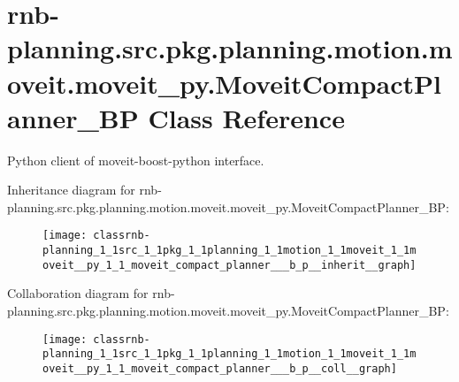 \hypertarget{classrnb-planning_1_1src_1_1pkg_1_1planning_1_1motion_1_1moveit_1_1moveit__py_1_1_moveit_compact_planner___b_p}{}\section{rnb-\/planning.src.\+pkg.\+planning.\+motion.\+moveit.\+moveit\+\_\+py.\+Moveit\+Compact\+Planner\+\_\+\+BP Class Reference}
\label{classrnb-planning_1_1src_1_1pkg_1_1planning_1_1motion_1_1moveit_1_1moveit__py_1_1_moveit_compact_planner___b_p}


Python client of moveit-\/boost-\/python interface.  




Inheritance diagram for rnb-\/planning.src.\+pkg.\+planning.\+motion.\+moveit.\+moveit\+\_\+py.\+Moveit\+Compact\+Planner\+\_\+\+BP\+:\nopagebreak
\begin{figure}[H]
\begin{center}
\leavevmode
\texttt{[image: classrnb-planning\_1\_1src\_1\_1pkg\_1\_1planning\_1\_1motion\_1\_1moveit\_1\_1moveit\_\_py\_1\_1\_moveit\_compact\_planner\_\_\_b\_p\_\_inherit\_\_graph]}
\end{center}
\end{figure}


Collaboration diagram for rnb-\/planning.src.\+pkg.\+planning.\+motion.\+moveit.\+moveit\+\_\+py.\+Moveit\+Compact\+Planner\+\_\+\+BP\+:\nopagebreak
\begin{figure}[H]
\begin{center}
\leavevmode
\texttt{[image: classrnb-planning\_1\_1src\_1\_1pkg\_1\_1planning\_1\_1motion\_1\_1moveit\_1\_1moveit\_\_py\_1\_1\_moveit\_compact\_planner\_\_\_b\_p\_\_coll\_\_graph]}
\end{center}
\end{figure}
